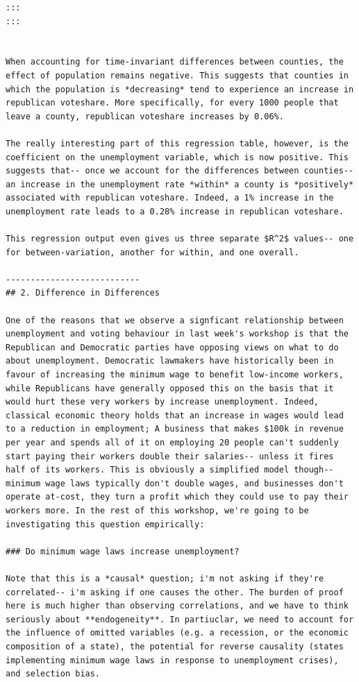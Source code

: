 \documentclass[
  letterpaper,
  DIV=11,
  numbers=noendperiod]{scrreprt}
\begin{document}
\begin{verbatim}
:::
:::


When accounting for time-invariant differences between counties, the effect of population remains negative. This suggests that counties in which the population is *decreasing* tend to experience an increase in republican voteshare. More specifically, for every 1000 people that leave a county, republican voteshare increases by 0.06%. 

The really interesting part of this regression table, however, is the coefficient on the unemployment variable, which is now positive. This suggests that-- once we account for the differences between counties-- an increase in the unemployment rate *within* a county is *positively* associated with republican voteshare. Indeed, a 1% increase in the unemployment rate leads to a 0.28% increase in republican voteshare. 

This regression output even gives us three separate $R^2$ values-- one for between-variation, another for within, and one overall. 

---------------------------
## 2. Difference in Differences

One of the reasons that we observe a signficant relationship between unemployment and voting behaviour in last week's workshop is that the Republican and Democratic parties have opposing views on what to do about unemployment. Democratic lawmakers have historically been in favour of increasing the minimum wage to benefit low-income workers, while Republicans have generally opposed this on the basis that it would hurt these very workers by increase unemployment. Indeed, classical economic theory holds that an increase in wages would lead to a reduction in employment; A business that makes $100k in revenue per year and spends all of it on employing 20 people can't suddenly start paying their workers double their salaries-- unless it fires half of its workers. This is obviously a simplified model though-- minimum wage laws typically don't double wages, and businesses don't operate at-cost, they turn a profit which they could use to pay their workers more. In the rest of this workshop, we're going to be investigating this question empirically: 

### Do minimum wage laws increase unemployment?

Note that this is a *causal* question; i'm not asking if they're correlated-- i'm asking if one causes the other. The burden of proof here is much higher than observing correlations, and we have to think seriously about **endogeneity**. In partiuclar, we need to account for the influence of omitted variables (e.g. a recession, or the economic composition of a state), the potential for reverse causality (states implementing minimum wage laws in response to unemployment crises), and selection bias.


\end{verbatim}
\end{document}
